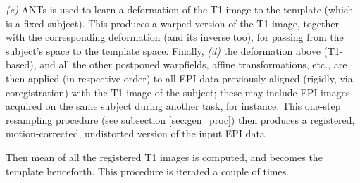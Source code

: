 
\textit{(c)} ANTs is used to learn a deformation of the T1
    image to the
    template (which is a fixed subject). This produces a warped
    version of the T1 image, together with the corresponding
    deformation (and its inverse too), for passing from the subject's
    space to the template space. Finally,
\textit{(d)} the deformation above (T1-based), and all the
    other postponed
    warpfields, affine transformations, etc., are then applied (in
    respective order) to all EPI data previously aligned (rigidly, via
    coregistration) with the T1 image of the subject; these may
    include EPI images acquired on the same subject during another task,
    for instance. This one-step resampling procedure (see subsection
    \ref{sec:gen_proc}) then produces a registered, motion-corrected,
    undistorted version of the input EPI data.
\label{sec:classical}

Then mean of all the registered T1 images is computed, and becomes the template henceforth. This procedure is iterated a couple of times.



